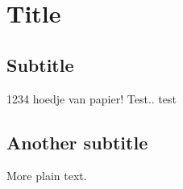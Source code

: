 \documentclass{article}
\begin{document}
\section{Title}

\subsection{Subtitle}

1234 hoedje van papier!
Test.. test
\subsection{Another subtitle}

More plain text.
\end{document}
